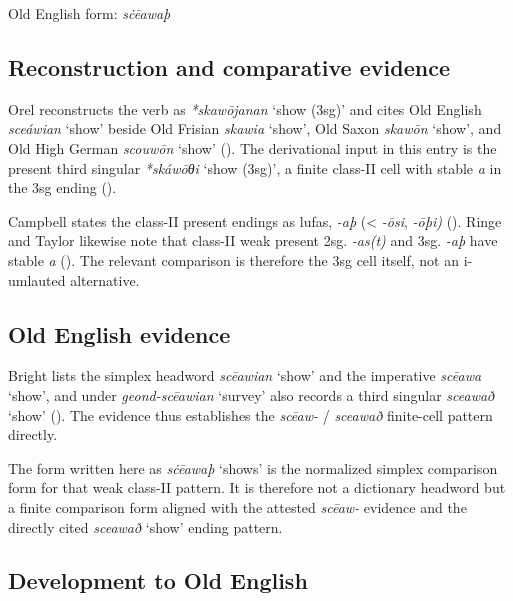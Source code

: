 \documentclass[
  british,
  a4paper,
  openany]{book}
\providecommand{\Recon}[1]{\emph{*#1}}
{\catcode`→=\active \global\def→{\ensuremath{\rightarrow}}}
\providecommand{\Recon}[1]{\emph{*#1}}
{\catcode`→=\active \global\def→{\ensuremath{\rightarrow}}}
\begin{document}
Old English form: \emph{sċēawaþ}

\subsection{Reconstruction and comparative
evidence}\label{reconstruction-and-comparative-evidence-135}

Orel reconstructs the verb as {\Recon{skawōjanan} `show (3sg)'} and
cites Old English {\emph{sceáwian}} `show' beside Old Frisian
{\emph{skawia}} `show', Old Saxon {\emph{skawōn}} `show', and Old High
German {\emph{scouwōn}} `show' (). The derivational input in this entry is the present third
singular {\Recon{skáwōθi} `show (3sg)'}, a finite class-II cell with
stable \emph{a} in the 3sg ending ().

Campbell states the class-II present endings as lufas, \emph{-aþ}
(\textless{} \emph{-ōsi}, \emph{-ōþi)}
(). Ringe and
Taylor likewise note that class-II weak present 2sg. \emph{-as(t)} and
3sg. \emph{-aþ} have stable \emph{a}
(). The
relevant comparison is therefore the 3sg cell itself, not an i-umlauted
alternative.

\subsection{Old English evidence}\label{old-english-evidence-135}

Bright lists the simplex headword {\emph{scēawian}} `show' and the
imperative {\emph{scēawa}} `show', and under \emph{geond-scēawian}
`survey' also records a third singular \emph{sceawað} `show'
(). The
evidence thus establishes the \emph{scēaw-} / \emph{sceawað} finite-cell
pattern directly.

The form written here as {\emph{sċēawaþ}} `shows' is the normalized
simplex comparison form for that weak class-II pattern. It is therefore
not a dictionary headword but a finite comparison form aligned with the
attested \emph{scēaw-} evidence and the directly cited \emph{sceawað}
`show' ending pattern.

\subsection{Development to Old
English}\label{development-to-old-english-135}
\end{document}
